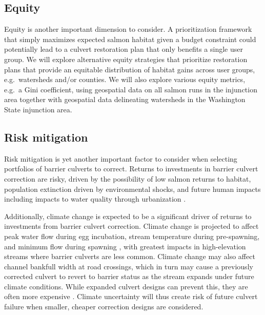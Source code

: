 \documentclass[12pt]{elsarticle}
\begin{document}

\subsection*{Equity}

Equity is another important dimension to consider. A prioritization framework that simply maximizes expected salmon habitat given a budget constraint could potentially lead to a culvert restoration plan that only benefits a single user group. We will explore alternative equity strategies that prioritize restoration plans that provide an equitable distribution of habitat gains across user groups, e.g.\ watersheds and/or counties. We will also explore various equity metrics, e.g.\ a Gini coefficient, using geospatial data on all salmon runs in the injunction area together with geospatial data delineating watersheds in the Washington State injunction area. 

\subsection*{Risk mitigation}

Risk mitigation is yet another important factor to consider when selecting portfolios of barrier culverts to correct. Returns to investments in barrier culvert correction are risky, driven by the possibility of low salmon returns to habitat, population extinction driven by environmental shocks, and future human impacts including impacts to water quality through urbanization \citep{ettinger_prioritizing_2021}. 

Additionally, climate change is expected to be a significant driver of returns to investments from barrier culvert correction. Climate change is projected to affect peak water flow during egg incubation, stream temperature during pre-spawning, and minimum flow during spawning \citep{battin_projected_2007}, with greatest impacts in high-elevation streams where barrier culverts are less common. Climate change may also affect channel bankfull width at road crossings, which in turn may cause a previously corrected culvert to revert to barrier status as the stream expands under future climate conditions. While expanded culvert designs can prevent this, they are often more expensive \cite{guillaume_mauger_climate_nodate}. Climate uncertainty will thus create risk of future culvert failure when smaller, cheaper correction designs are considered. 
\end{document}
